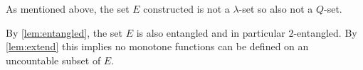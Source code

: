 \documentclass[11pt]{amsart}
\newtheorem{lemma}[theorem]{Lemma}
\theoremstyle{definition}
\theoremstyle{remark}
\theoremstyle{plain}
\begin{document}
As mentioned above, the set $E$ constructed is not a $\lambda$-set so also not a $Q$-set. 




By \ref{lem:entangled}, the set $E$ is also entangled and in particular $2$-entangled. By \ref{lem:extend} this implies no monotone functions can be defined on an uncountable subset of $E$. 
\end{document}
